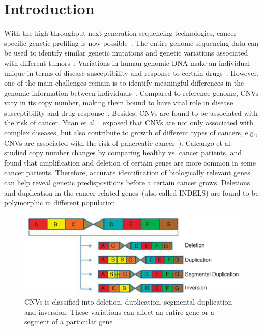 \section{Introduction}
With the high-throughput next-generation sequencing technologies, cancer-specific genetic profiling is now possible~\cite{tomczak2015cancer,tcga}. The entire genome sequencing data can be used to identify similar genetic mutations and genetic variations associated with different tumors~\cite{82Tomczak}. 
Variations in human genomic DNA make an individual unique in terms of disease susceptibility and response to certain drugs~\cite{almal2012implications}. 
However, one of the main challenges remain is to identify meaningful differences in the genomic information between individuals~\cite{almal2012implications}. 
Compared to reference genome, CNVs  vary in its copy number, making them bound to have vital role in disease susceptibility and drug response~\cite{almal2012implications}.
Besides, CNVs are found to be associated with the risk of cancer. 
Yuan et al.~\cite{yuan2018cancer} exposed that  CNVs are not only associated with complex diseases, but also contribute to growth of different types of cancers, e.g., CNVs are associated with the risk of pancreatic cancer~\cite{66Huang}). Calcango et al.~\cite{67Calcagno} studied copy number changes by comparing healthy vs. cancer patients, and found that amplification and deletion of certain genes are more common in some cancer patients. Therefore, accurate identification of biologically relevant genes can help reveal genetic predispositions before a certain cancer grows. Deletions and duplication in the cancer-related genes~(also called INDELS) are found to be polymorphic in different population. 

\begin{figure}
	\centering
	\includegraphics[scale=0.5]{images/cnv_v1.png} 
	\caption[Copy number variations, showing deletion, duplication, and inversion]{CNVs is classified into deletion, duplication, segmental duplication and inversion. These variations can affect an entire gene or a segment of a particular gene~\cite{almal2012implications}}	
	\label{fig:cnv_v1}
	\vspace{-2mm}
\end{figure}

